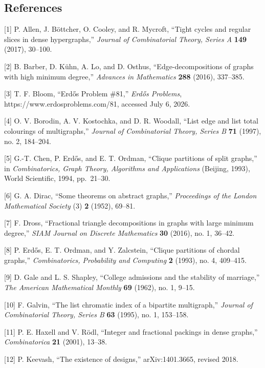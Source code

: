 \documentclass[
  11pt,
]{article}
\begin{document}
\subsection{References}\label{references}

{[}1{]} P. Allen, J. Böttcher, O. Cooley, and R. Mycroft, ``Tight cycles
and regular slices in dense hypergraphs,'' \emph{Journal of
Combinatorial Theory, Series A} \textbf{149} (2017), 30--100.

{[}2{]} B. Barber, D. Kühn, A. Lo, and D. Osthus, ``Edge-decompositions
of graphs with high minimum degree,'' \emph{Advances in Mathematics}
\textbf{288} (2016), 337--385.

{[}3{]} T. F. Bloom, ``Erdős Problem \#81,'' \emph{Erdős Problems},
https://www.erdosproblems.com/81, accessed July 6, 2026.

{[}4{]} O. V. Borodin, A. V. Kostochka, and D. R. Woodall, ``List edge
and list total colourings of multigraphs,'' \emph{Journal of
Combinatorial Theory, Series B} \textbf{71} (1997), no. 2, 184--204.

{[}5{]} G.-T. Chen, P. Erdős, and E. T. Ordman, ``Clique partitions of
split graphs,'' in \emph{Combinatorics, Graph Theory, Algorithms and
Applications} (Beijing, 1993), World Scientific, 1994, pp.~21--30.

{[}6{]} G. A. Dirac, ``Some theorems on abstract graphs,''
\emph{Proceedings of the London Mathematical Society} (3) \textbf{2}
(1952), 69--81.

{[}7{]} F. Dross, ``Fractional triangle decompositions in graphs with
large minimum degree,'' \emph{SIAM Journal on Discrete Mathematics}
\textbf{30} (2016), no. 1, 36--42.

{[}8{]} P. Erdős, E. T. Ordman, and Y. Zalcstein, ``Clique partitions of
chordal graphs,'' \emph{Combinatorics, Probability and Computing}
\textbf{2} (1993), no. 4, 409--415.

{[}9{]} D. Gale and L. S. Shapley, ``College admissions and the
stability of marriage,'' \emph{The American Mathematical Monthly}
\textbf{69} (1962), no. 1, 9--15.

{[}10{]} F. Galvin, ``The list chromatic index of a bipartite
multigraph,'' \emph{Journal of Combinatorial Theory, Series B}
\textbf{63} (1995), no. 1, 153--158.

{[}11{]} P. E. Haxell and V. Rödl, ``Integer and fractional packings in
dense graphs,'' \emph{Combinatorica} \textbf{21} (2001), 13--38.

{[}12{]} P. Keevash, ``The existence of designs,'' arXiv:1401.3665,
revised 2018.
\end{document}
